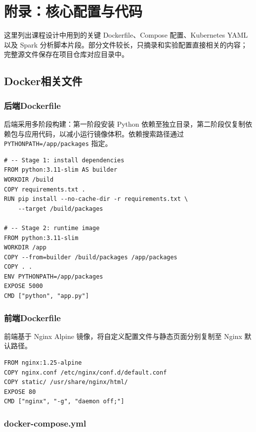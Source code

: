 \section{附录：核心配置与代码}

这里列出课程设计中用到的关键 Dockerfile、Compose 配置、Kubernetes YAML 以及 Spark 分析脚本片段。部分文件较长，只摘录和实验配置直接相关的内容；完整源文件保存在项目仓库对应目录中。

\subsection{Docker相关文件}

\subsubsection{后端Dockerfile}

后端采用多阶段构建：第一阶段安装 Python 依赖至独立目录，第二阶段仅复制依赖包与应用代码，以减小运行镜像体积。依赖搜索路径通过 \verb|PYTHONPATH=/app/packages| 指定。

\begin{lstlisting}[caption={backend/Dockerfile（多阶段构建）}, label=lst:backend-dockerfile]
# -- Stage 1: install dependencies
FROM python:3.11-slim AS builder
WORKDIR /build
COPY requirements.txt .
RUN pip install --no-cache-dir -r requirements.txt \
    --target /build/packages

# -- Stage 2: runtime image
FROM python:3.11-slim
WORKDIR /app
COPY --from=builder /build/packages /app/packages
COPY . .
ENV PYTHONPATH=/app/packages
EXPOSE 5000
CMD ["python", "app.py"]
\end{lstlisting}

\subsubsection{前端Dockerfile}

前端基于 Nginx Alpine 镜像，将自定义配置文件与静态页面分别复制至 Nginx 默认路径。

\begin{lstlisting}[caption={frontend/Dockerfile}, label=lst:frontend-dockerfile]
FROM nginx:1.25-alpine
COPY nginx.conf /etc/nginx/conf.d/default.conf
COPY static/ /usr/share/nginx/html/
EXPOSE 80
CMD ["nginx", "-g", "daemon off;"]
\end{lstlisting}

\subsubsection{docker-compose.yml}

